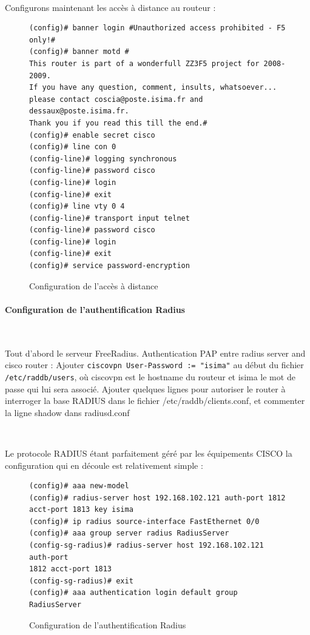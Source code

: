 ~

Configurons maintenant les accès à distance au routeur :
\begin{figure}[H]
	\begin{center}
		\begin{minipage}{0.95\textwidth}
			\begin{lstlisting}[frame=trBL]
(config)# banner login #Unauthorized access prohibited - F5 only!#
(config)# banner motd #
This router is part of a wonderfull ZZ3F5 project for 2008-2009.
If you have any question, comment, insults, whatsoever...
please contact coscia@poste.isima.fr and dessaux@poste.isima.fr.
Thank you if you read this till the end.#
(config)# enable secret cisco
(config)# line con 0
(config-line)# logging synchronous
(config-line)# password cisco
(config-line)# login
(config-line)# exit
(config)# line vty 0 4
(config-line)# transport input telnet
(config-line)# password cisco
(config-line)# login
(config-line)# exit
(config)# service password-encryption
			\end{lstlisting}
		\end{minipage}
	\end{center}
	\caption{Configuration de l'accès à distance}
	\label{configuration_acces_a_distance}
\end{figure}

\paragraph{Configuration de l'authentification Radius}
\label{CONFIG_RADIUS}
~

Tout d'abord le serveur FreeRadius.
Authentication PAP entre radius server and cisco router :
Ajouter \verb|ciscovpn User-Password := "isima"|  au début du fichier \verb|/etc/raddb/users|, où ciscovpn est le hostname du routeur et isima le mot de passe qui lui sera associé.
Ajouter quelques lignes pour autoriser le router à interroger la base RADIUS dans le fichier /etc/raddb/clients.conf, et commenter la ligne shadow dans radiusd.conf

~

Le protocole RADIUS étant parfaitement géré par les équipements CISCO la configuration qui en découle est relativement simple :

\begin{figure}[H]
	\begin{center}
		\begin{minipage}{0.90\textwidth}
			\begin{lstlisting}[frame=trBL]
(config)# aaa new-model
(config)# radius-server host 192.168.102.121 auth-port 1812
acct-port 1813 key isima
(config)# ip radius source-interface FastEthernet 0/0
(config)# aaa group server radius RadiusServer
(config-sg-radius)# radius-server host 192.168.102.121 auth-port
1812 acct-port 1813
(config-sg-radius)# exit
(config)# aaa authentication login default group RadiusServer
			\end{lstlisting}
		\end{minipage}
	\end{center}
	\caption{Configuration de l'authentification Radius}
	\label{configuration_authentification_radius}
\end{figure}


